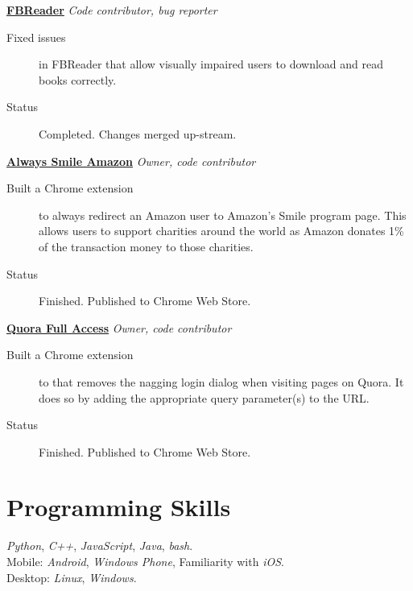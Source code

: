 \documentclass[margin,line]{resume}
\begin{document}
\begin{resume}
	\textbf{\href{https://github.com/aawc/FBReaderJ}{FBReader}} \hfill \textsl{Code contributor, bug reporter}\\
	\begin{description}
	\item [Fixed issues] in FBReader that allow visually impaired users to download and read books correctly.
	\item [Status] Completed. Changes merged up-stream.
    \end{description}

	\textbf{\href{https://github.com/aawc/AlwaysSmileAmazon}{Always Smile Amazon}} \hfill \textsl{Owner, code contributor}\\
	\begin{description}
	\item [Built a Chrome extension] to always redirect an Amazon user to Amazon's Smile program page. This allows users to support charities around the world as Amazon donates 1\% of the transaction money to those charities.
	\item [Status] Finished. Published to Chrome Web Store.
    \end{description}

	\textbf{\href{https://github.com/aawc/QuoraFullAccess}{Quora Full Access}} \hfill \textsl{Owner, code contributor}\\
	\begin{description}
	\item [Built a Chrome extension] to that removes the nagging login dialog when visiting pages on Quora. It does so by adding the appropriate query parameter(s) to the URL.
	\item [Status] Finished. Published to Chrome Web Store.
    \end{description}

	\section{Programming Skills}
    \textit{Python}, \textit{C++}, \textit{JavaScript}, \textit{Java}, \textit{bash}.\\
	Mobile: \textit{Android}, \textit{Windows Phone}, Familiarity with \textit{iOS}.\\
	Desktop: \textit{Linux}, \textit{Windows}.
	

\end{resume}
\end{document}

